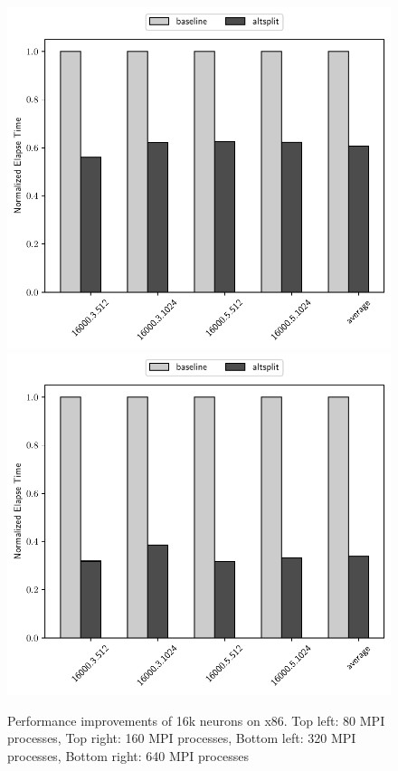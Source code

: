 \begin{figure}[H]
{        \includegraphics[scale=0.60]{altsplit/figs/mn4/16000_avgs_320.pdf}
        \includegraphics[scale=0.60]{altsplit/figs/mn4/16000_avgs_640.pdf}
    }
    \caption{Performance improvements of 16k neurons on x86. Top left: 80 MPI 
    processes, Top right: 160 MPI processes, Bottom left: 320 MPI processes, 
    Bottom right: 640 MPI processes}
    \label{fig:altsplit_16k_mn4}
\end{figure}

